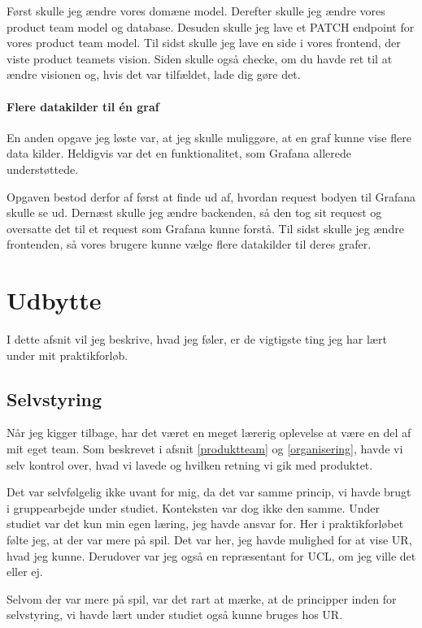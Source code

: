 \documentclass[a4paper]{article}
\begin{document}
Først skulle jeg ændre vores domæne model.
Derefter skulle jeg ændre vores product team model og database.
Desuden skulle jeg lave et PATCH endpoint for vores product team model.
Til sidst skulle jeg lave en side i vores frontend,
der viste product teamets vision.
Siden skulle også checke, om du havde ret til at ændre visionen og,
 hvis det var tilfældet, lade dig gøre det.

 \paragraph{Flere datakilder til én graf}
En anden opgave jeg løste var, at jeg skulle muliggøre,
at en graf kunne vise flere data kilder.
Heldigvis var det en funktionalitet, som Grafana allerede understøttede.

Opgaven bestod derfor af først at finde ud af,
hvordan request bodyen til Grafana skulle se ud.
Dernæst skulle jeg ændre backenden,
så den tog sit request og oversatte det til et request som Grafana kunne forstå.
Til sidst skulle jeg ændre frontenden,
så vores brugere kunne vælge flere datakilder til deres grafer.

\newpage
\section{Udbytte}
\label{udbytte}
I dette afsnit vil jeg beskrive,
hvad jeg føler,
er de vigtigste ting jeg har lært under mit praktikforløb.

\subsection{Selvstyring}
Når jeg kigger tilbage,
har det været en meget lærerig oplevelse at være en del af mit eget team.
Som beskrevet i afsnit \ref{produktteam} og \ref{organisering},
havde vi selv kontrol over, hvad vi lavede og hvilken retning vi gik med produktet.

Det var selvfølgelig ikke uvant for mig,
da det var samme princip, vi havde brugt i gruppearbejde under studiet.
Konteksten var dog ikke den samme.
Under studiet var det kun min egen læring, jeg havde ansvar for.
Her i praktikforløbet følte jeg, at der var mere på spil.
Det var her, jeg havde mulighed for at vise UR, hvad jeg kunne.
Derudover var jeg også en repræsentant for UCL, om jeg ville det eller ej.

Selvom der var mere på spil, var det rart at mærke,
at de principper inden for selvstyring,
vi havde lært under studiet også kunne bruges hos UR.
\end{document}
